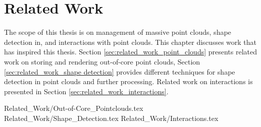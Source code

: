 \chapter {Related Work}
\label{chap:related_work}

The scope of this thesis is on management of massive point clouds, shape detection in, and interactions with point clouds. This chapter discusses work that has inspired this thesis. Section \ref{sec:related_work_point_clouds} presents related work on storing and rendering out-of-core point clouds, Section \ref{sec:related_work_shape detection} provides different techniques for shape detection in point clouds and further processing. Related work on interactions is presented in Section \ref{sec:related_work_interactions}. 

 {Related_Work/Out-of-Core_Pointclouds.tex}
 {Related_Work/Shape_Detection.tex}
 {Related_Work/Interactions.tex}